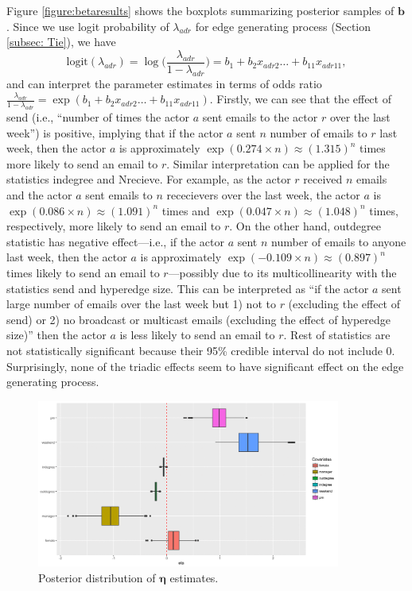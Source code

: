 \documentclass[ba]{imsart}
\numberwithin{equation}{section}
\theoremstyle{plain}
\begin{document}
	Figure \ref{figure:betaresults} shows the boxplots summarizing posterior samples of $\boldsymbol{b}$. Since we use logit probability of $\lambda_{adr}$ for edge generating process (Section \ref{subsec: Tie}), we have
	\begin{equation*}
	\mbox{logit}(\lambda_{adr})=\log\Big(\frac{\lambda_{adr}}{1-\lambda_{adr}}\Big) =b_{1}+b_{2} x_{adr2}\ldots+b_{11}x_{adr11},
	\end{equation*}
	and can interpret the parameter estimates in terms of odds ratio $\frac{\lambda_{adr}}{1-\lambda_{adr}}=\exp(b_{1}+b_{2} x_{adr2}\ldots+b_{11}x_{adr11})$.
	Firstly, we can see that the effect of send (i.e., ``number of times the actor $a$ sent emails to the actor $r$ over the last week'') is positive, implying that if the actor $a$ sent $n$ number of emails to $r$ last week, then the actor $a$ is approximately $\exp(0.274\times n)\approx(1.315)^n$ times more likely to send an email to $r$. Similar interpretation can be applied for the statistics indegree and Nrecieve. For example, as the actor $r$ received $n$ emails and the actor $a$ sent emails to $n$ rececievers over the last week, the actor $a$ is $\exp(0.086\times n)\approx(1.091)^n $ times and $\exp(0.047\times n)\approx(1.048)^n$ times, respectively, more likely to send an email to $r$. On the other hand, outdegree statistic has negative effect---i.e., if the actor $a$ sent $n$ number of emails to anyone last week, then the actor $a$ is approximately $\exp(-0.109\times n)\approx(0.897)^n$ times likely to send an email to $r$---possibly due to its multicollinearity with the statistics send and hyperedge size. This can be interpreted as ``if the actor $a$ sent large number of emails over the last week but 1) not to $r$ (excluding the effect of send) or 2) no broadcast or multicast emails (excluding the effect of hyperedge size)'' then the actor $a$ is less likely to send an email to $r$. Rest of statistics are not statistically significant because their 95\% credible interval do not include 0. Surprisingly, none of the triadic effects seem to have significant effect on the edge generating process.
	\begin{figure}[!t]
		\centering
		\includegraphics[width=0.89\textwidth]{img/etaest-1.png}	
		\caption {Posterior distribution of $\boldsymbol{\eta}$ estimates.}
		\label{figure:etaresults}
	\end{figure}
	
\end{document}
